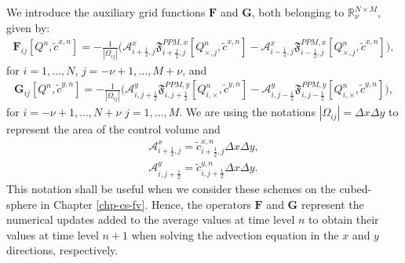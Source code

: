 We introduce the auxiliary grid functions $\mathbf{F}$ and $\mathbf{G}$, both belonging to $\mathbb{R}^{N\times M}_{\nu}$, given by:
\begin{align*}
\mathbf{F}_{ij}[{Q^n,\tilde{c}^{x,n}}] = 
-\frac{1}{|\Omega_{ij}|}
	  \bigg(\mathcal{A}_{i+\frac{1}{2},j}^{x} \mathfrak{F}_{i+\frac{1}{2},j}^{PPM,x}[Q^n_{\times,j},\tilde{c}^{x,n}]-
               \mathcal{A}_{i-\frac{1}{2},j}^{x} \mathfrak{F}_{i-\frac{1}{2},j}^{PPM,x}[Q^n_{\times,j},\tilde{c}^{x,n}] \bigg),
\end{align*}
for $i=1, \ldots, N$, $j=-\nu+1, \ldots, M + \nu$, and
\begin{align*}
\mathbf{G}_{ij}[{Q^n,\tilde{c}^{y,n}}] = 
-\frac{1}{|\Omega_{ij}|}
	  \bigg(\mathcal{A}_{i,j+\frac{1}{2}}^{y} \mathfrak{F}_{i,j+\frac{1}{2}}^{PPM,y}[Q^n_{i,\times},\tilde{c}^{y,n}]-
                \mathcal{A}_{i,j-\frac{1}{2}}^{y} \mathfrak{F}_{i,j-\frac{1}{2}}^{PPM,y}[Q^n_{i,\times},\tilde{c}^{y,n}] \bigg),
\end{align*}
for $i=-\nu+1, \ldots, N + \nu$  $j=1, \ldots, M$.
We are using the notations $|\Omega_{ij}|= \Delta x \Delta y$ to represent the area of the control volume and
\begin{align*}
\mathcal{A}_{i+\frac{1}{2},j}^{x} = \tilde{c}_{i+\frac{1}{2},j}^{x,n} \Delta x \Delta y,\\
\mathcal{A}_{i,j+\frac{1}{2}}^{y} = \tilde{c}_{i,j+\frac{1}{2}}^{y,n} \Delta x \Delta y.
\end{align*}
This notation shall be useful when we consider these schemes on the cubed-sphere in Chapter \ref{chp-cs-fv}.
Hence, the operators $\mathbf{F}$ and $\mathbf{G}$ represent the numerical updates added to the average values 
at time level $n$ to obtain their values at time level $n+1$ when solving the advection equation in the $x$ and $y$ directions, respectively.

